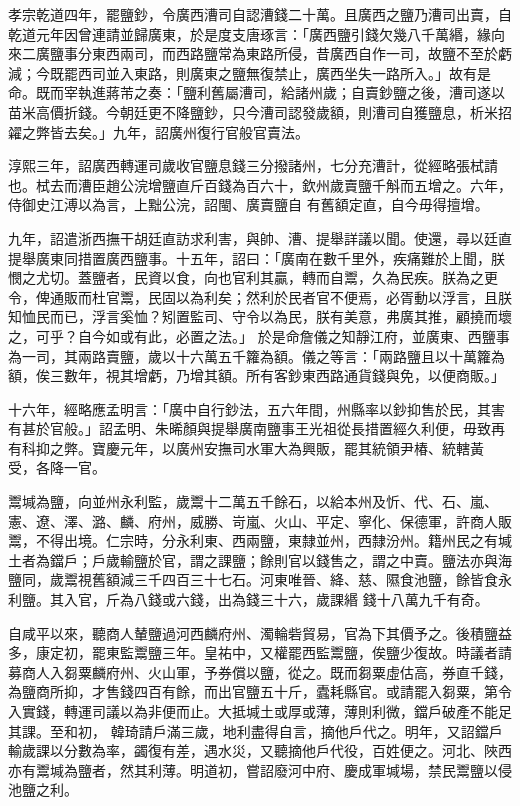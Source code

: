 \begin{pinyinscope}
 孝宗乾道四年，罷鹽鈔，令廣西漕司自認漕錢二十萬。且廣西之鹽乃漕司出賣，自乾道元年因曾連請並歸廣東，於是度支唐琢言：「廣西鹽引錢欠幾八千萬緡，緣向來二廣鹽事分東西兩司，而西路鹽常為東路所侵，昔廣西自作一司，故鹽不至於虧減；今既罷西司並入東路，則廣東之鹽無復禁止，廣西坐失一路所入。」故有是
 命。既而宰執進蔣芾之奏：「鹽利舊屬漕司，給諸州歲；自賣鈔鹽之後，漕司遂以苗米高價折錢。今朝廷更不降鹽鈔，只今漕司認發歲額，則漕司自獲鹽息，析米招糴之弊皆去矣。」九年，詔廣州復行官般官賣法。



 淳熙三年，詔廣西轉運司歲收官鹽息錢三分撥諸州，七分充漕計，從經略張栻請也。栻去而漕臣趙公浣增鹽直斤百錢為百六十，欽州歲賣鹽千斛而五增之。六年，侍御史江溥以為言，上黜公浣，詔閩、廣賣鹽自
 有舊額定直，自今毋得擅增。



 九年，詔遣浙西撫干胡廷直訪求利害，與帥、漕、提舉詳議以聞。使還，尋以廷直提舉廣東同措置廣西鹽事。十五年，詔曰：「廣南在數千里外，疾痛難於上聞，朕憫之尤切。蓋鹽者，民資以食，向也官利其贏，轉而自鬻，久為民疾。朕為之更令，俾通販而杜官鬻，民固以為利矣；然利於民者官不便焉，必胥動以浮言，且朕知恤民而已，浮言奚恤？矧置監司、守令以為民，朕有美意，弗廣其推，顧撓而壞之，可乎？自今如或有此，必置之法。」
 於是命詹儀之知靜江府，並廣東、西鹽事為一司，其兩路賣鹽，歲以十六萬五千籮為額。儀之等言：「兩路鹽且以十萬籮為額，俟三數年，視其增虧，乃增其額。所有客鈔東西路通貨錢與免，以便商販。」



 十六年，經略應孟明言：「廣中自行鈔法，五六年間，州縣率以鈔抑售於民，其害有甚於官般。」詔孟明、朱晞顏與提舉廣南鹽事王光祖從長措置經久利便，毋致再有科抑之弊。寶慶元年，以廣州安撫司水軍大為興販，罷其統領尹椿、統轄黃
 受，各降一官。



 鬻堿為鹽，向並州永利監，歲鬻十二萬五千餘石，以給本州及忻、代、石、嵐、憲、遼、澤、潞、麟、府州，威勝、岢嵐、火山、平定、寧化、保德軍，許商人販鬻，不得出境。仁宗時，分永利東、西兩鹽，東隸並州，西隸汾州。籍州民之有堿土者為鐺戶；戶歲輸鹽於官，謂之課鹽；餘則官以錢售之，謂之中賣。鹽法亦與海鹽同，歲鬻視舊額減三千四百三十七石。河東唯晉、絳、慈、隰食池鹽，餘皆食永利鹽。其入官，斤為八錢或六錢，出為錢三十六，歲課緡
 錢十八萬九千有奇。



 自咸平以來，聽商人輦鹽過河西麟府州、濁輪砦貿易，官為下其價予之。後積鹽益多，康定初，罷東監鬻鹽三年。皇祐中，又權罷西監鬻鹽，俟鹽少復故。時議者請募商人入芻粟麟府州、火山軍，予券償以鹽，從之。既而芻粟虛估高，券直千錢，為鹽商所抑，才售錢四百有餘，而出官鹽五十斤，蠹耗縣官。或請罷入芻粟，第令入實錢，轉運司議以為非便而止。大抵堿土或厚或薄，薄則利微，鐺戶破產不能足其課。至和初，
 韓琦請戶滿三歲，地利盡得自言，摘他戶代之。明年，又詔鐺戶輸歲課以分數為率，蠲復有差，遇水災，又聽摘他戶代役，百姓便之。河北、陜西亦有鬻堿為鹽者，然其利薄。明道初，嘗詔廢河中府、慶成軍堿場，禁民鬻鹽以侵池鹽之利。




\end{pinyinscope}
